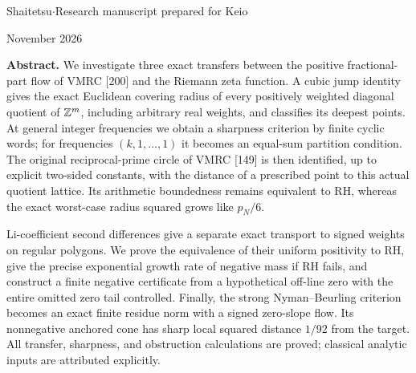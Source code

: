 \documentclass[11pt,a4paper]{article}
\theoremstyle{definition}\newtheorem{definition}[theorem]{Definition}
\theoremstyle{remark}\newtheorem{remark}[theorem]{Remark}
\numberwithin{equation}{section}
\begin{document}
\begin{titlepage}
\par
\vspace{9mm}
\vspace{5mm}
\par
\vspace{7mm}
\noindent Shaitetsu\quad$\cdot$\quad Research manuscript prepared for Keio\par
{} November 2026\par
\vspace{7mm}
\noindent\textbf{Abstract.}
We investigate three exact transfers between the positive fractional-part
flow of VMRC [200] and the Riemann zeta function. A cubic jump identity
gives the exact Euclidean covering radius of every positively weighted
diagonal quotient of $\mathbb Z^m$, including arbitrary real weights, and
classifies its deepest points. At general integer frequencies we obtain
a sharpness criterion by finite cyclic words; for frequencies
$(k,1,\ldots,1)$ it becomes an equal-sum partition condition.
The original reciprocal-prime circle of VMRC [149] is then identified,
up to explicit two-sided constants, with the distance of a prescribed
point to this actual quotient lattice. Its arithmetic boundedness
remains equivalent to RH, whereas the exact worst-case radius squared
grows like $p_N/6$.

Li-coefficient second differences give a separate exact transport to
signed weights on regular polygons. We prove the equivalence of their
uniform positivity to RH, give the precise exponential growth rate of
negative mass if RH fails, and construct a finite negative certificate
from a hypothetical off-line zero with the entire omitted zero tail
controlled. Finally, the strong Nyman--Beurling criterion becomes an
exact finite residue norm with a signed zero-slope flow. Its nonnegative
anchored cone has sharp local squared distance $1/92$ from the target.
All transfer, sharpness, and obstruction calculations are proved;
classical analytic inputs are attributed explicitly.
\vfill
\noindent{}
\end{titlepage}
\end{document}
